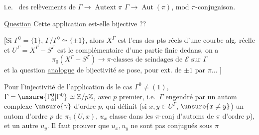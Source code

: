 
i.e.\  des relèvements de $\Gamma\longrightarrow\operatorname{Autext}\pi$  $\Gamma\longrightarrow\operatorname{Aut}(\pi)$, mod $\pi$-conjugaison.

\uline{Question}  Cette application est-elle bijective ??

[Si $\Gamma^0=\{1\}$, $\Gamma/\Gamma^0\simeq\{\pm1\}$, alors $X^\Gamma$ est l'ens des pts réels d'une courbe alg. réelle et $U^\Gamma=X^\Gamma-S^\Gamma$ est le complémentaire d'une partie finie dedans, on a
\[
\pi_0(X^\Gamma-S^\Gamma)\longrightarrow
\pi\text{-classes de scindages de }\mathcal E\text{ sur }\Gamma
\]
et la  question \uline{analogue} de bijectivité se pose, pour ext. de $\pm1$ par $\pi$... ]

Pour l'injectivité de l'application ds le cas $\Gamma^0\ne(1)$,  $\Gamma=\unsure{\Gamma^0_a|\Gamma^0}\simeq\mathbb Z/p\mathbb Z$, avec $p$ premier, i.e.\ $\Gamma$ engendré par un autom complexe $\unsure{\gamma}$ d'ordre $p$, qui définit (si $x,y\in U^\Gamma$, $\unsure{x\ne y}$) un autom d'ordre $p$ de $\pi_1(U,x)$,  $u_x$   classe dans les $\pi$-conj d'automs de $\pi$ d'ordre $p$), et un autre $u_y$.
Il faut prouver que $u_x,u_y$ ne sont pas conjugués sous $\pi$


